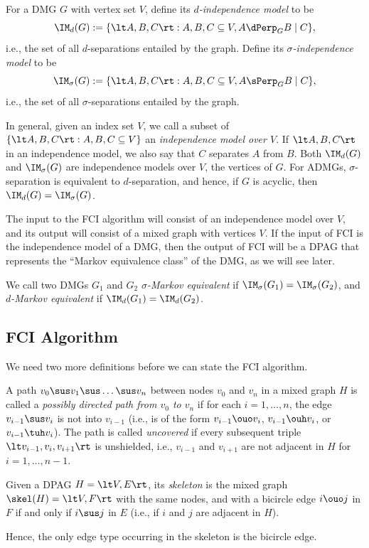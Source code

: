 \begin{Def}\label{def:independence_model}
  For a DMG $G$ with vertex set $V$, define its \emph{$d$-independence model} to be
  $$\IM_d(G) := \{ \lt A, B, C \rt : A, B, C \subseteq V, A \dPerp_G B \mid C \},$$
  i.e., the set of all $d$-separations entailed by the graph. Define its
  \emph{$\sigma$-independence model} to be
  $$\IM_\sigma(G) := \{ \lt A, B, C \rt : A, B, C \subseteq V, A \sPerp_G B \mid C \},$$
  i.e., the set of all $\sigma$-separations entailed by the graph. 
\end{Def}
In general, given an index set $V$, we call a subset of 
$\{ \lt A, B, C \rt : A, B, C \subseteq V \}$
an \emph{independence model over $V$}.
If $\lt A, B, C \rt$ in an independence model, we also say that $C$ separates $A$ from $B$.
Both $\IM_d(G)$ and $\IM_\sigma(G)$ are independence models over $V$, the vertices of $G$.
For ADMGs, $\sigma$-separation is equivalent to $d$-separation, and hence, if $G$ is acyclic, then
$\IM_d(G) = \IM_\sigma(G)$.

The input to the FCI algorithm will consist of an independence model over $V$,
and its output will consist of a mixed graph with vertices $V$.
If the input of FCI is the independence model of a DMG, then the output of FCI
will be a DPAG that represents the ``Markov equivalence class'' of the DMG, as
we will see later.
\begin{Def}\label{def:Markov_equivalent}
  We call two DMGs $G_1$ and $G_2$ \emph{$\sigma$-Markov equivalent} if $\IM_\sigma(G_1) = \IM_\sigma(G_2)$,
  and \emph{$d$-Markov equivalent} if $\IM_d(G_1) = \IM_d(G_2)$.
\end{Def}

\subsection{FCI Algorithm}

We need two more definitions before we can state the FCI algorithm.
\begin{Def}\label{def:pdpath}
  A path $v_0 \sus v_1 \sus \dots \sus v_n$ between nodes $v_0$ and $v_n$ in a mixed graph $H$ is called a \emph{possibly directed path from $v_0$ to $v_n$} if for each $i=1,\dots,n$, the edge $v_{i-1} \sus v_i$ is not into $v_{i-1}$ (i.e., is of the form $v_{i-1} \ouo v_i$, $v_{i-1} \ouh v_i$, or $v_{i-1} \tuh v_i$). 
  The path is called \emph{uncovered} if every subsequent triple $\lt v_{i-1}, v_i, v_{i+1} \rt$ is unshielded, i.e., $v_{i-1}$ and $v_{i+1}$ are not adjacent in $H$ for $i=1,\dots,n-1$.
\end{Def}
\begin{Def}\label{def:skeleton}
Given a DPAG $H = \lt V, E \rt$, its \emph{skeleton} is the mixed graph 
$\skel(H) = \lt V, F \rt$ with the same nodes, and with a bicircle edge $i \ouo j$ in $F$
  if and only if $i \sus j$ in $E$ (i.e., if $i$ and $j$ are adjacent in $H$).
\end{Def}
Hence, the only edge type occurring in the skeleton is the bicircle edge.

